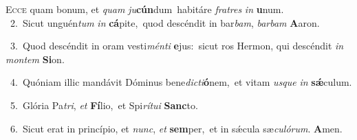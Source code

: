 \lettrine{\initial\textcolor{\initialcolor}{E}}{cce} quam bonum, et \textit{quam} \textit{ju}\-\textbf{cún}dum~\star habitáre \textit{fra}\-\textit{tres} \textit{in} \textbf{u}\-num.\\
{\numbfont\textcolor{\numbcolor}{~2.}}~Sicut unguén\textit{tum} \textit{in} \textbf{cá}\-pite,~\star quod descéndit in bar\-\textit{bam}\-, \textit{bar}\-\textit{bam} \textbf{A}\-aron.\par
{\numbfont\textcolor{\numbcolor}{~3.}}~Quod descéndit in oram vesti\-\textit{mén}\-\textit{ti} \textbf{e}\-jus:~\star sicut ros Hermon, qui descéndit \textit{in} \textit{mon}\-\textit{tem} \textbf{Si}\-on.\par
{\numbfont\textcolor{\numbcolor}{~4.}}~Quóniam illic mandávit Dóminus bene\-\textit{dic}\-\textit{ti}\textbf{ó}nem,~\star et vitam \textit{us}\-\textit{que} \textit{in} \textbf{sǽ}\-culum.\par
{\numbfont\textcolor{\numbcolor}{~5.}}~Glória Pa\-\textit{tri}\-, \textit{et} \textbf{Fí}\-lio,~\star et Spi\-\textit{rí}\-\textit{tu}\textit{i} \textbf{Sanc}\-to.\par
{\numbfont\textcolor{\numbcolor}{~6.}}~Sicut erat in princípio, et \textit{nunc}\-, \textit{et} \textbf{sem}\-per,~\star et in sǽcula sæ\-\textit{cu}\-\textit{ló}\textit{rum}. \textbf{A}\-men.\par
